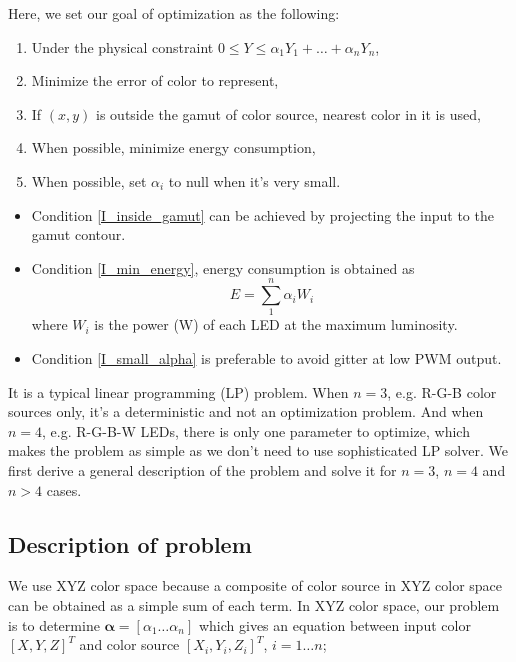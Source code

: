 \documentclass[dvipdfmx,uplatex]{article}
\begin{document}
Here, we set our goal of optimization as the following:
\begin{enumerate}
  \item\label{I_max_luminance} Under the physical constraint $0 \leq Y \leq \alpha_1 Y_1 + \ldots + \alpha_n Y_n$,
  \item Minimize the error of color to represent,
  \item\label{I_inside_gamut} If $(x, y)$ is outside the gamut of color source, nearest color in it is used,
  \item\label{I_min_energy} When possible, minimize energy consumption,
  \item\label{I_small_alpha} When possible, set $\alpha_i$ to null when it's very small.
\end{enumerate}

\begin{itemize}
  \item Condition \ref{I_inside_gamut} can be achieved by projecting the input to the gamut contour.
  \item Condition \ref{I_min_energy}, energy consumption is obtained as
  \begin{equation}
    \label{E_min_energy}
    E = \sum_1^n \alpha_i W_i
  \end{equation}
  where $W_i$ is the power (W) of each LED at the maximum luminosity.
  \item Condition \ref{I_small_alpha} is preferable to avoid gitter at low PWM output.
\end{itemize}

It is a typical linear programming (LP) problem. When $n=3$, e.g. R-G-B color sources only, it's a deterministic and not an optimization problem. And when $n=4$, e.g. R-G-B-W LEDs, there is only one parameter to optimize, which makes the problem as simple as we don't need to use sophisticated LP solver. We first derive a general description of the problem and solve it for $n=3$, $n=4$ and $n > 4$ cases.

\subsection{Description of problem}
We use XYZ color space because a composite of color source in XYZ color space can be obtained as a simple sum of each term.  In XYZ color space, our problem is to determine $\boldsymbol{\alpha} = [\alpha_1 \ldots \alpha_n]$ which gives an equation between input color $[X, Y, Z]^T$ and color source $[X_{i}, Y_{i}, Z_{i}]^T$, $i=1 \ldots n$;
\end{document}
